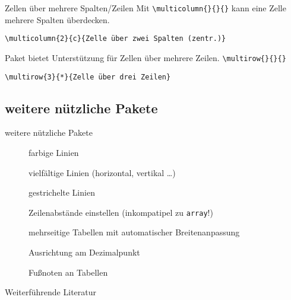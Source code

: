 \documentclass[
	vorläufig=false,
	datum=2016-11-11,
	titel={Gleitumgebungen und Tabellen},
	web=false,
	noshortverb=true,
]{../tex/latexkurs-slides}
\begin{document}
\iffalse
\begin{frame}[fragile]{supertabularx, longtablex}
Für Satz mehrseitiger Tabellen mit automatischer Breitenanpassung:
\only<1>{\texttt{supertabularx} bzw. \texttt{longtablex}}
\only<2->{\sout{\texttt{supertabularx} bzw. \texttt{longtablex}}}
\pause\pause
\begin{itemize}
\item Paket \verb/ltxtable/ bietet grundlegende Unterstützung
\item Kombination von \verb/longtable/ und \verb/tabularx/
\item Tabelle (\texttt{tabularx}) selbst steht in externer Datei
\item Nutzer muss diese selbst anlegen, schreiben und verwalten
\item Einbinden mittels \texttt{\textbackslash LTXtable\{\meta{width}\}\{\meta{file}\}}
\item am besten mittels \verb/filecontents/ (Umgebung, Paket)
\end{itemize}
\end{frame}
\fi

\begin{frame}[fragile]{Zellen über mehrere Spalten/Zeilen}
Mit \verb|\multicolumn{|\verb|}{|\verb|}{|\verb|}| kann eine Zelle mehrere Spalten überdecken.
\begin{lstlisting}
\multicolumn{2}{c}{Zelle über zwei Spalten (zentr.)}
\end{lstlisting}
\pause\vfill
Paket  bietet Unterstützung für Zellen über mehrere Zeilen.
\verb|\multirow{|\verb|}{|\verb|}{|\verb|}|
\begin{lstlisting}
\multirow{3}{*}{Zelle über drei Zeilen}
\end{lstlisting}
\end{frame}

\subsection[weiteres]{weitere nützliche Pakete}
\begin{frame}[fragile]{weitere nützliche Pakete}
\begin{description}
\item[] farbige Linien
\item[] vielfältige Linien (horizontal, vertikal \dots)
\item[] gestrichelte Linien 
\item[] Zeilenabstände einstellen (inkompatipel zu \verb|array|!)
\item[] mehrseitige Tabellen mit automatischer Breitenanpassung
\item[] Ausrichtung am Dezimalpunkt %
\item[] Fußnoten an Tabellen
\end{description}
\end{frame}

\nocite{booktabs,dante:tabellen}
\begin{frame}[allowframebreaks]{Weiterführende Literatur}
\printbibliography
\end{frame}
\end{document}

